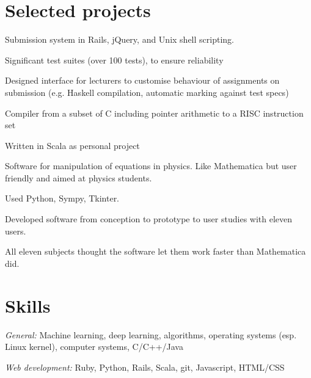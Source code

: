 \documentclass[letterpaper]{resume}
\begin{document}
\section{Selected projects}

\begin{compactitem}
\item Submission system in Rails, jQuery, and Unix shell scripting.
\item Significant test suites (over 100 tests), to ensure reliability
\item Designed interface for lecturers to customise behaviour of assignments on submission (e.g. Haskell compilation, automatic marking against test specs)
\end{compactitem}

\begin{compactitem}
\item Compiler from a subset of C including pointer arithmetic to a RISC instruction set
\item Written in Scala as personal project
\end{compactitem}

\begin{compactitem}
\item Software for manipulation of equations in physics. Like Mathematica but user friendly and aimed at physics students.
\item Used Python, Sympy, Tkinter.
\item Developed software from conception to prototype to user studies with eleven users.
\item All eleven subjects thought the software let them work faster than Mathematica did.
\end{compactitem}


\section{Skills}
\textit{General:} Machine learning, deep learning, algorithms, operating systems (esp. Linux kernel), computer systems, C/C++/Java

\textit{Web development:} Ruby, Python, Rails, Scala, git, Javascript, HTML/CSS\\
\end{document}
